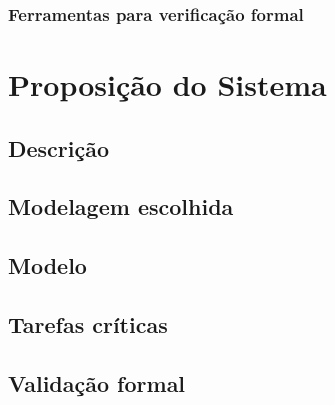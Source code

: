 \documentclass{article}
\begin{document}
		\subsubsection{Ferramentas para verificação formal}

\section{Proposição do Sistema}
	\subsection{Descrição}
	\subsection{Modelagem escolhida}
	\subsection{Modelo}
	\subsection{Tarefas críticas}
	\subsection{Validação formal}
\end{document}

